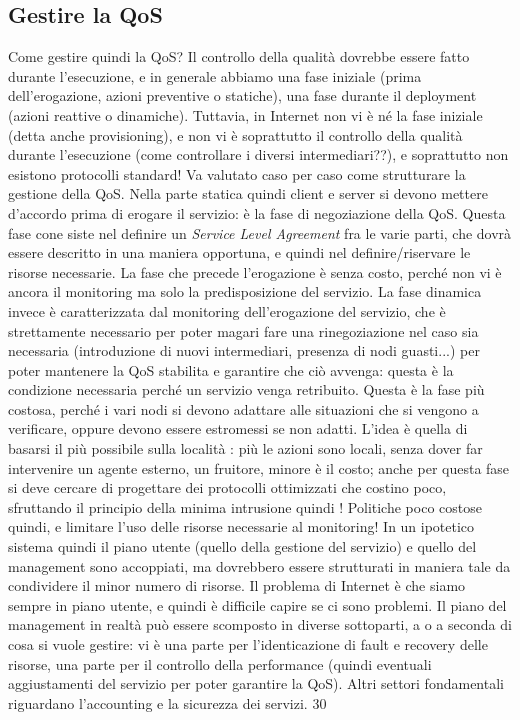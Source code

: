 \subsection{Gestire la QoS}
Come gestire quindi la QoS? Il controllo della qualità dovrebbe essere fatto durante l'esecuzione, e in generale 
abbiamo una fase iniziale (prima dell'erogazione, azioni preventive o statiche), una fase durante il deployment 
(azioni reattive o dinamiche). Tuttavia, in Internet non vi è né la fase iniziale (detta anche provisioning), e non 
vi è soprattutto il controllo della qualità durante l'esecuzione (come controllare i diversi intermediari??), e
soprattutto non esistono protocolli standard! Va valutato caso per caso come strutturare la gestione della QoS.
Nella parte statica quindi client e server si devono mettere d'accordo prima di erogare il servizio: è la fase di
negoziazione della QoS. Questa fase cone siste nel definire un \textit{Service Level Agreement} fra le varie parti, 
che dovrà essere descritto in una maniera opportuna, e quindi nel definire/riservare le risorse necessarie. La fase 
che precede l'erogazione è senza costo, perché non vi è ancora il monitoring ma solo la predisposizione del servizio.
La fase dinamica invece è caratterizzata dal monitoring dell'erogazione del servizio, che è strettamente necessario 
per poter magari fare una rinegoziazione nel caso sia necessaria (introduzione di nuovi intermediari, presenza di 
nodi guasti...) per poter mantenere la QoS stabilita e garantire che ciò avvenga: questa è la condizione necessaria
perché un servizio venga retribuito. Questa è la fase più costosa, perché i vari nodi si devono adattare alle 
situazioni che si
vengono a verificare, oppure devono essere estromessi se non adatti. L'idea è
quella di basarsi il più possibile sulla località : più le azioni sono locali, senza
dover far intervenire un agente esterno, un fruitore, minore è il costo; anche per
questa fase si deve cercare di progettare dei protocolli ottimizzati che costino
poco, sfruttando il principio della minima intrusione quindi ! Politiche poco
costose quindi, e limitare l'uso delle risorse necessarie al monitoring! In un
ipotetico sistema quindi il piano utente (quello della gestione del servizio) e
quello del management sono accoppiati, ma dovrebbero essere strutturati in
maniera tale da condividere il minor numero di risorse. Il problema di Internet
è che siamo sempre in piano utente, e quindi è difficile capire se ci sono problemi.
Il piano del management in realtà può essere scomposto in diverse sottoparti,
a o
a seconda di cosa si vuole gestire: vi è una parte per l'identicazione di fault
e recovery delle risorse, una parte per il controllo della performance (quindi
eventuali aggiustamenti del servizio per poter garantire la QoS). Altri settori
fondamentali riguardano l'accounting e la sicurezza dei servizi.
30
